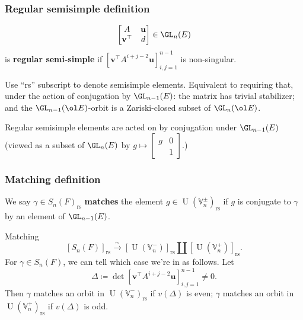 \documentclass[11pt]{beamer}
\DeclareMathOperator{\U}{U}
\newcommand{\VV}{\mathbb{V}}
\newcommand{\rs}{_{\text{rs}}}
\newcommand{\uu}{\mathbf{u}}
\newcommand{\vv}{\mathbf{v}}
\begin{document}
\begin{frame}
  \frametitle{Regular semisimple definition}
  \[ \begin{bmatrix} A & \uu \\ \vv^\top & d \end{bmatrix} \in \GL_n(E) \]
  is \textbf{regular semi-simple} if
  $\left[ \vv^\top A^{i+j-2} \uu \right]_{i,j=1}^{n-1}$
  is non-singular.
  \begin{itemize}
    \ii Use ``rs'' subscript to denote semisimple elements.
    \ii Equivalent to requiring that, under the action of conjugation by $\GL_{n-1}(E)$:
    the matrix has trivial stabilizer; and
    the $\GL_{n-1}(\ol E)$-orbit is a Zariski-closed subset of $\GL_n(\ol E)$.
  \end{itemize}
  Regular semisimple elements are acted on by conjugation under $\GL_{n-1}(E)$
  (viewed as a subset of $\GL_n(E)$ by $g \mapsto \begin{bmatrix} g & 0 \\ & 1 \end{bmatrix}$.)
\end{frame}

\begin{frame}
  \frametitle{Matching definition}
  We say $\gamma \in S_n(F)\rs$ \textbf{matches} the element $g \in \U(\VV_n^\pm)\rs$
  if $g$ is conjugate to $\gamma$ by an element of $\GL_{n-1}(E)$.
  \begin{block}{Matching}
    \[ [S_n(F)]\rs \xrightarrow{\sim} [\U(\VV_n^-)]\rs \amalg [\U(\VV_n^+)]\rs. \]
    For $\gamma \in S_n(F)$, we can tell which case we're in as follows.
    Let
    \[ \Delta \coloneqq \det \left[ \vv^\top A^{i+j-2} \uu \right]_{i,j=1}^{n-1} \neq 0. \]
    Then $\gamma$ matches an orbit in $\U(\VV_n^-)\rs$ if $v(\Delta)$ is even;
    $\gamma$ matches an orbit in $\U(\VV_n^+)\rs$ if $v(\Delta)$ is odd.
  \end{block}
\end{frame}
\end{document}
